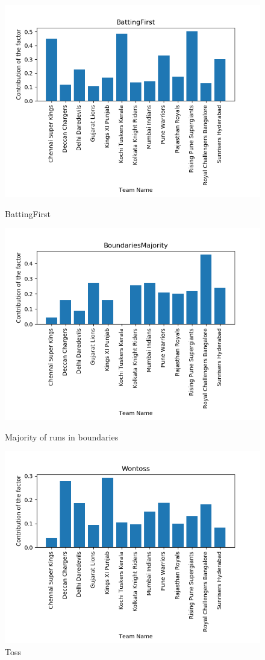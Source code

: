 \documentclass[sigconf]{acmart}
\begin{document}
\begin{figure}[!ht]
  \centering\includegraphics[width=\columnwidth]{images/BattingFirst.png}
  \caption{BattingFirst}\label{f:BattingFirst}
  
  \centering\includegraphics[width=\columnwidth]{images/BoundariesMajority.png}
  \caption{Majority of runs in boundaries}\label{f:BoundariesMajority}
  
  \centering\includegraphics[width=\columnwidth]{images/Wontoss.png}
  \caption{Toss}\label{f:Wontoss}
  

\end{figure}
\end{document}
